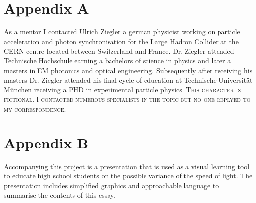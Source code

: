 \documentclass[12pt,letterpaper]{article}
\begin{document}
\section{Appendix A}
As a mentor I contacted Ulrich Ziegler a german physicist working on particle acceleration and photon synchronisation for the Large Hadron Collider at the CERN centre located between Switzerland and France. Dr. Ziegler attended Technische Hochschule earning a bachelors of science in physics and later a masters in EM photonics and optical engineering. Subsequently after receiving his masters Dr. Ziegler attended his final cycle of education at Technische Universität München receiving a PHD in experimental particle physics.\footnotemark{} 
\tiny\textsc{This character is fictional. I contacted numerous specialists in the topic but no one replyed to my correspondence.} \normalsize

\section{Appendix B}
Accompanying this project is a presentation that is used as a visual learning tool to educate high school students on the possible variance of the speed of light. The presentation includes simplified graphics and approachable language to summarise the contents of this essay. 
\end{document}
